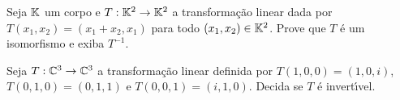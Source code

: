 \documentclass[12pt]{exam}
\begin{document}
\begin{exercicio}
  Seja $\mathbb{K}$ um corpo e $T : \mathbb{K}^2 \to \mathbb{K}^2$ a transforma\c{c}\~ao linear dada por $T(x_1,x_2) = (x_1 + x_2, x_1)$ para todo $(x_1,x_2) \in \mathbb{K}^2$. Prove que $T$ \'e um isomorfismo e exiba $T^{-1}$.
\end{exercicio}

\begin{exercicio}
  Seja $T : \mathbb{C}^3 \to \mathbb{C}^3$ a transforma\c{c}\~ao linear definida por $T(1,0,0) = (1,0,i)$, $T(0,1,0) = (0,1,1)$ e $T(0,0,1) = (i,1,0)$. Decida se $T$ \'e invert{\'\i}vel.
\end{exercicio}



\end{document}
